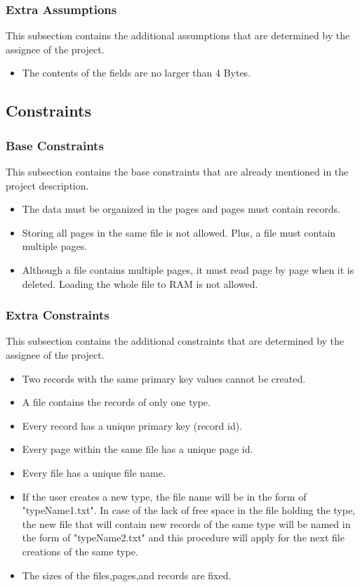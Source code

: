 \documentclass[12pt]{article}
\begin{document}
    \subsubsection{Extra Assumptions}
    \tab This subsection contains the additional assumptions that are determined by the assignee of the project.
    \begin{itemize}
    \item The contents of the fields are no larger than 4 Bytes.
    
\end{itemize}

\subsection{Constraints}
\subsubsection{Base Constraints}
\tab This subsection contains the base constraints that are already mentioned in the project description.
\begin{itemize}
    \item The data must be organized in the pages and pages must contain records.
    \item Storing all pages in the same file is not allowed. Plus, a file must contain multiple pages.
    \item Although a file contains multiple pages, it must read page by page when it is deleted. Loading the whole file to RAM is not allowed.
\end{itemize}

\subsubsection{Extra Constraints}
\tab This subsection contains the additional constraints that are determined by the assignee of the project.
\begin{itemize}
    \item Two records with the same primary key values cannot be created.
    \item A file contains the records of only one type.
    \item Every record has a unique primary key (record id).
    \item Every page within the same file has a unique page id.
    \item Every file has a unique file name.
    \item If the user creates a new type, the file name will be in the form of "typeName1.txt". In case of the lack of free space in the file holding the type, the new file that will contain new records of the same type will be named in the form of "typeName2.txt" and this procedure will apply for the next file creations of the same type.
    \item The sizes of the files,pages,and records are fixed.
\end{itemize}
\end{document}
